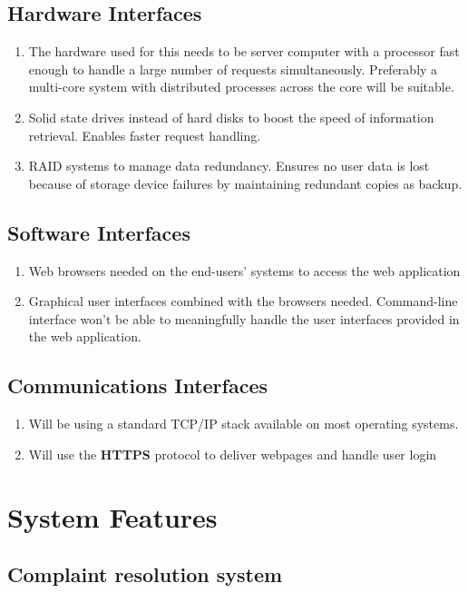 \documentclass{scrreprt}
\begin{document}
\section{Hardware Interfaces}
\begin{enumerate}
    \item The hardware used for this needs to be server computer with a processor fast enough to handle a large number of requests simultaneously. Preferably a multi-core system with distributed processes across the core will be suitable.
    \item Solid state drives instead of hard disks to boost the speed of information retrieval. Enables faster request handling.
    \item RAID systems to manage data redundancy. Ensures no user data is lost because of storage device failures by maintaining redundant copies as backup.
\end{enumerate}
\section{Software Interfaces}
\begin{enumerate}
    \item Web browsers needed on the end-users' systems to access the web application
    \item Graphical user interfaces combined with the browsers needed. Command-line interface won't be able to meaningfully handle the user interfaces provided in the web application.
\end{enumerate}
\section{Communications Interfaces}
\begin{enumerate}
    \item Will be using a standard TCP/IP stack available on most operating systems.
    \item Will use the \textbf{HTTPS} protocol to deliver webpages and handle user login
\end{enumerate}

\chapter{System Features}

\section{Complaint resolution system}
\end{document}
